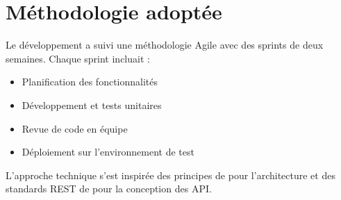 \section{Méthodologie adoptée}
Le développement a suivi une méthodologie Agile avec des sprints de deux semaines. Chaque sprint incluait :
\begin{itemize}
	\item Planification des fonctionnalités
	\item Développement et tests unitaires
	\item Revue de code en équipe
	\item Déploiement sur l'environnement de test
\end{itemize}

L'approche technique s'est inspirée des principes de \cite{martin2017clean} pour l'architecture et des standards REST de \cite{fielding2000rest} pour la conception des API.